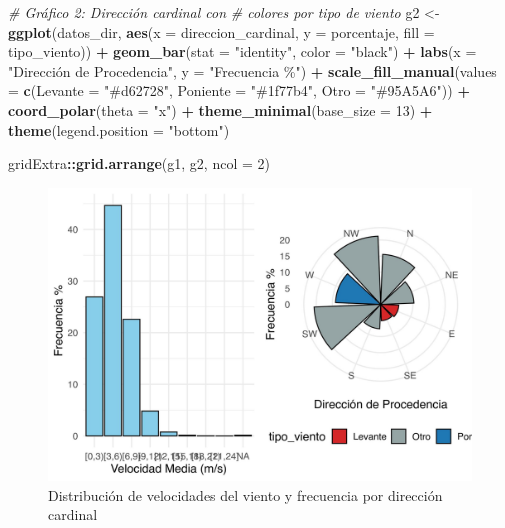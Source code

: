 \documentclass[
]{article}
\newenvironment{Shaded}{\begin{snugshade}}{\end{snugshade}}
\newcommand{\AttributeTok}[1]{\textcolor[rgb]{0.13,0.29,0.53}{#1}}
\newcommand{\CommentTok}[1]{\textcolor[rgb]{0.56,0.35,0.01}{\textit{#1}}}
\newcommand{\DecValTok}[1]{\textcolor[rgb]{0.00,0.00,0.81}{#1}}
\newcommand{\FunctionTok}[1]{\textcolor[rgb]{0.13,0.29,0.53}{\textbf{#1}}}
\newcommand{\NormalTok}[1]{#1}
\newcommand{\OtherTok}[1]{\textcolor[rgb]{0.56,0.35,0.01}{#1}}
\newcommand{\SpecialCharTok}[1]{\textcolor[rgb]{0.81,0.36,0.00}{\textbf{#1}}}
\newcommand{\StringTok}[1]{\textcolor[rgb]{0.31,0.60,0.02}{#1}}
\begin{document}
\begin{Shaded}
\begin{Highlighting}[]
\CommentTok{\# Gráfico 2: Dirección cardinal con}
\CommentTok{\# colores por tipo de viento}
\NormalTok{g2 }\OtherTok{\textless{}{-}} \FunctionTok{ggplot}\NormalTok{(datos\_dir, }\FunctionTok{aes}\NormalTok{(}\AttributeTok{x =}\NormalTok{ direccion\_cardinal,}
    \AttributeTok{y =}\NormalTok{ porcentaje, }\AttributeTok{fill =}\NormalTok{ tipo\_viento)) }\SpecialCharTok{+}
    \FunctionTok{geom\_bar}\NormalTok{(}\AttributeTok{stat =} \StringTok{"identity"}\NormalTok{, }\AttributeTok{color =} \StringTok{"black"}\NormalTok{) }\SpecialCharTok{+}
    \FunctionTok{labs}\NormalTok{(}\AttributeTok{x =} \StringTok{"Dirección de Procedencia"}\NormalTok{,}
        \AttributeTok{y =} \StringTok{"Frecuencia \%"}\NormalTok{) }\SpecialCharTok{+} \FunctionTok{scale\_fill\_manual}\NormalTok{(}\AttributeTok{values =} \FunctionTok{c}\NormalTok{(}\AttributeTok{Levante =} \StringTok{"\#d62728"}\NormalTok{,}
    \AttributeTok{Poniente =} \StringTok{"\#1f77b4"}\NormalTok{, }\AttributeTok{Otro =} \StringTok{"\#95A5A6"}\NormalTok{)) }\SpecialCharTok{+}
    \FunctionTok{coord\_polar}\NormalTok{(}\AttributeTok{theta =} \StringTok{"x"}\NormalTok{) }\SpecialCharTok{+} \FunctionTok{theme\_minimal}\NormalTok{(}\AttributeTok{base\_size =} \DecValTok{13}\NormalTok{) }\SpecialCharTok{+}
    \FunctionTok{theme}\NormalTok{(}\AttributeTok{legend.position =} \StringTok{"bottom"}\NormalTok{)}

\NormalTok{gridExtra}\SpecialCharTok{::}\FunctionTok{grid.arrange}\NormalTok{(g1, g2, }\AttributeTok{ncol =} \DecValTok{2}\NormalTok{)}
\end{Highlighting}
\end{Shaded}

\begin{figure}[h]

{\centering \includegraphics{Levante_Analisys_files/figure-latex/frequency-analysis-1} 

}

\caption{Distribución de velocidades del viento y frecuencia por dirección cardinal}\label{fig:frequency-analysis}
\end{figure}
\end{document}

